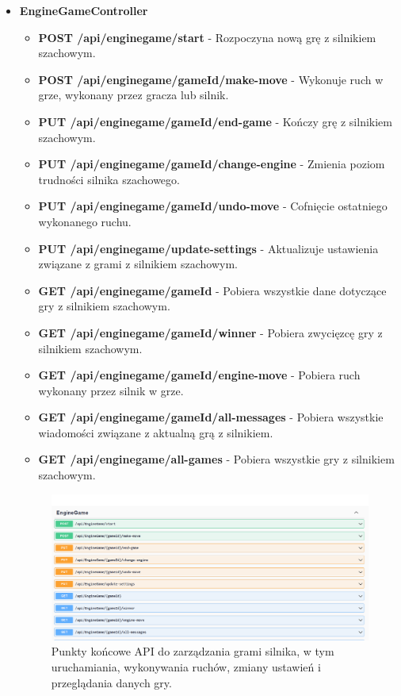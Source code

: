 \documentclass[12pt,a4paper]{article}
\begin{document}
\begin{itemize}
    \item \textbf{EngineGameController}
    \begin{itemize} 
        \item \textbf{POST /api/enginegame/start} - Rozpoczyna nową grę z silnikiem szachowym. 
        \item \textbf{POST /api/enginegame/{gameId}/make-move} - Wykonuje ruch w grze, wykonany przez gracza lub silnik.
        \item \textbf{PUT /api/enginegame/{gameId}/end-game} - Kończy grę z silnikiem szachowym. 
        \item \textbf{PUT /api/enginegame/{gameId}/change-engine} - Zmienia poziom trudności silnika szachowego. 
        \item \textbf{PUT /api/enginegame/{gameId}/undo-move} - Cofnięcie ostatniego wykonanego ruchu. 
        \item \textbf{PUT /api/enginegame/update-settings} - Aktualizuje ustawienia związane z grami z silnikiem szachowym. 
        \item \textbf{GET /api/enginegame/{gameId}} - Pobiera wszystkie dane dotyczące gry z silnikiem szachowym.
        \item \textbf{GET /api/enginegame/{gameId}/winner} - Pobiera zwycięzcę gry z silnikiem szachowym. 
        \item \textbf{GET /api/enginegame/{gameId}/engine-move} - Pobiera ruch wykonany przez silnik w grze. 
        \item \textbf{GET /api/enginegame/{gameId}/all-messages} - Pobiera wszystkie wiadomości związane z aktualną grą z silnikiem. 
        \item \textbf{GET /api/enginegame/all-games} - Pobiera wszystkie gry z silnikiem szachowym. 
    \end{itemize}
    \begin{figure}[h!]
        \centering
        \includegraphics[width=1\textwidth]{zdj/enginegame_controller.png}
        \caption{Punkty końcowe API do zarządzania grami silnika, w tym uruchamiania, wykonywania ruchów, zmiany ustawień i przeglądania danych gry.}
    \end{figure}
\end{itemize}
\end{document}
